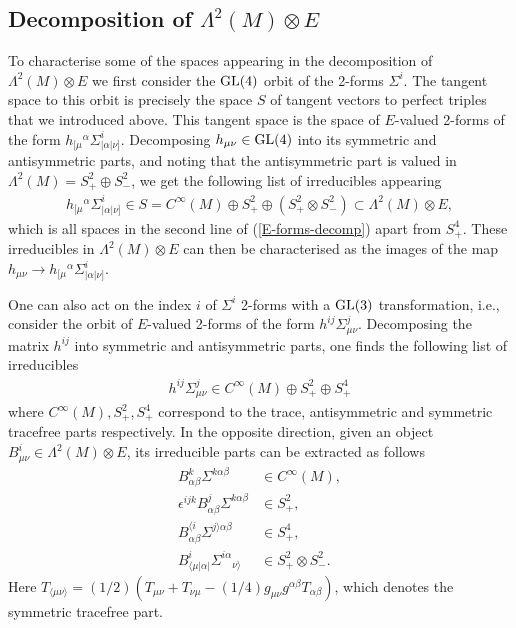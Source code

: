 \documentclass[10pt]{report}
\theoremstyle{definition}
\begin{document}
\subsection{Decomposition of \texorpdfstring{$\Lambda^2(M) \otimes E$}{}}\label{subsub:ell-decomposition-of-E-2-forms}
To characterise some of the spaces appearing in the decomposition of $\Lambda^2(M) \otimes E$ we first consider the ${\rm GL}(4)$ orbit of the 2-forms $\Sigma^i$. The tangent space to this orbit is precisely the space $S$ of tangent vectors to perfect triples that we introduced above. This tangent space is the space of $E$-valued 2-forms of the form $h_{[\mu}{}^\alpha \Sigma^i_{ |\alpha|\nu]}$. Decomposing $h_{\mu\nu}\in{\rm GL}(4)$ into its symmetric and antisymmetric parts, and noting that the antisymmetric part is valued in $\Lambda^2(M)=S_+^2 \oplus S_-^2$, we get the following list of irreducibles appearing  
\begin{align}\label{S-space-param}
h_{[\mu}{}^\alpha \Sigma^i_{ |\alpha|\nu]} \in S = C^\infty(M) \oplus S_+^2 \oplus (S_+^2 \otimes S_-^2) \subset \Lambda^2(M) \otimes E,
\end{align}
which is all spaces in the second line of (\ref{E-forms-decomp}) apart from $S_+^4$. These irreducibles in $\Lambda^2(M) \otimes E$ can then be characterised as the images of the map $h_{\mu\nu}\to h_{[\mu}{}^\alpha \Sigma^i_{ |\alpha|\nu]} $. 

One can also act on the index $i$ of $\Sigma^i$ 2-forms with a ${\rm GL}(3)$ transformation, i.e., consider the orbit of $E$-valued 2-forms of the form $h^{ij} \Sigma^j_{\mu\nu}$. Decomposing the matrix $h^{ij}$ into symmetric and antisymmetric parts, one finds the following list of irreducibles
\begin{align}
h^{ij} \Sigma^j_{\mu\nu} \in C^\infty(M) \oplus S_+^2 \oplus S_+^4
\end{align}
where $C^\infty(M), S_+^2, S_+^4$ correspond to the trace, antisymmetric and symmetric tracefree parts respectively. In the opposite direction, given an object $B^i_{\mu\nu}\in \Lambda^2(M) \otimes E$, its irreducible parts can be extracted as follows
\begin{align}\label{irreducibles}
B^{k}_{\alpha\beta} \Sigma^{k\alpha\beta} &\in C^\infty(M), \\ \nonumber
\epsilon^{ijk} B^j_{\alpha\beta} \Sigma^{k\alpha\beta} &\in S_+^2, \\ \nonumber
B^{\langle i}_{\alpha\beta} \Sigma^{j\rangle\alpha\beta} &\in S_+^4, \\ \nonumber
B^i_{\langle\mu|\alpha|} \Sigma^{i\alpha}{}_{\nu\rangle} &\in S_+^2 \otimes S_-^2 .
\end{align}
Here $T_{\langle \mu\nu \rangle} = (1/2)(T_{\mu\nu} + T_{\nu\mu} - (1/4) g_{\mu\nu} g^{\alpha\beta} T_{\alpha\beta})$, which denotes the symmetric tracefree part. 
\end{document}
